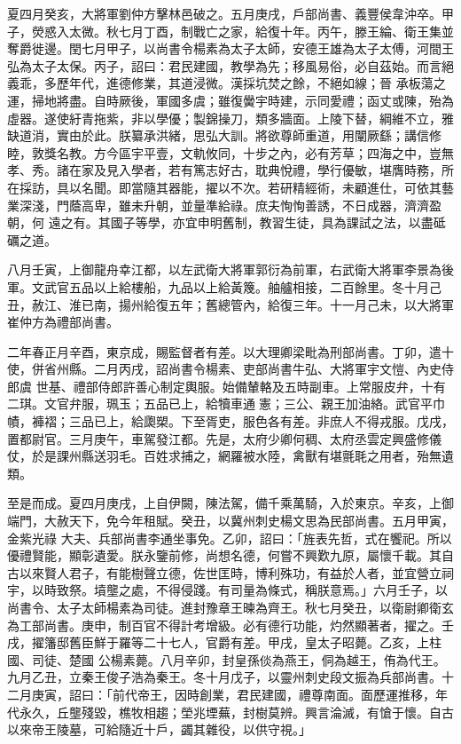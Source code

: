 \begin{pinyinscope}
 夏四月癸亥，大將軍劉仲方擊林邑破之。五月庚戌，戶部尚書、義豐侯韋沖卒。甲子，熒惑入太微。秋七月丁酉，制戰亡之家，給復十年。丙午，滕王綸、衛王集並奪爵徙邊。閏七月甲子，以尚書令楊素為太子太師，安德王雄為太子太傅，河間王弘為太子太保。丙子，詔曰：君民建國，教學為先；移風易俗，必自茲始。而言絕義乖，多歷年代，進德修業，其道浸微。漢採坑焚之餘，不絕如線；晉
 承板蕩之運，掃地將盡。自時厥後，軍國多虞；雖復黌宇時建，示同愛禮；函丈或陳，殆為虛器。遂使紆青拖紫，非以學優；製錦操刀，類多牆面。上陵下替，綱維不立，雅缺道消，實由於此。朕纂承洪緒，思弘大訓。將欲尊師重道，用闡厥繇；講信修睦，敦獎名教。方今區宇平壹，文軌攸同，十步之內，必有芳草；四海之中，豈無孝、秀。諸在家及見入學者，若有篤志好古，耽典悅禮，學行優敏，堪膺時務，所在採訪，具以名聞。即當隨其器能，擢以不次。若研精經術，未顧進仕，可依其藝業深淺，門蔭高卑，雖未升朝，並量準給祿。庶夫恂恂善誘，不日成器，濟濟盈朝，何
 遠之有。其國子等學，亦宜申明舊制，教習生徒，具為課試之法，以盡砥礪之道。



 八月壬寅，上御龍舟幸江都，以左武衛大將軍郭衍為前軍，右武衛大將軍李景為後軍。文武官五品以上給樓船，九品以上給黃篾。舳艫相接，二百餘里。冬十月己丑，赦江、淮已南，揚州給復五年；舊總管內，給復三年。十一月己未，以大將軍崔仲方為禮部尚書。



 二年春正月辛酉，東京成，賜監督者有差。以大理卿梁毗為刑部尚書。丁卯，遣十使，併省州縣。二月丙戌，詔尚書令楊素、吏部尚書牛弘、大將軍宇文愷、內史侍郎虞
 世基、禮部侍郎許善心制定輿服。始備輦輅及五時副車。上常服皮弁，十有二琪。文官弁服，珮玉；五品已上，給犢車通憲；三公、親王加油絡。武官平巾幘，褲褶；三品已上，給瓟槊。下至胥吏，服色各有差。非庶人不得戎服。戊戌，置都尉官。三月庚午，車駕發江都。先是，太府少卿何稠、太府丞雲定興盛修儀仗，於是課州縣送羽毛。百姓求捕之，網羅被水陸，禽獸有堪氈毦之用者，殆無遺類。



 至是而成。夏四月庚戌，上自伊闕，陳法駕，備千乘萬騎，入於東京。辛亥，上御端門，大赦天下，免今年租賦。癸丑，以冀州刺史楊文思為民部尚書。五月甲寅，金紫光祿
 大夫、兵部尚書李通坐事免。乙卯，詔曰：「旌表先哲，式在饗祀。所以優禮賢能，顯彰遺愛。朕永鑒前修，尚想名德，何嘗不興歎九原，屬懷千載。其自古以來賢人君子，有能樹聲立德，佐世匡時，博利殊功，有益於人者，並宜營立祠宇，以時致祭。墳壟之處，不得侵踐。有司量為條式，稱朕意焉。」六月壬子，以尚書令、太子太師楊素為司徒。進封豫章王暕為齊王。秋七月癸丑，以衛尉卿衛玄為工部尚書。庚申，制百官不得計考增級。必有德行功能，灼然顯著者，擢之。壬戌，擢籓邸舊臣鮮于羅等二十七人，官爵有差。甲戌，皇太子昭薨。乙亥，上柱國、司徒、楚國
 公楊素薨。八月辛卯，封皇孫倓為燕王，侗為越王，侑為代王。九月乙丑，立秦王俊子浩為秦王。冬十月戊子，以靈州刺史段文振為兵部尚書。十二月庚寅，詔曰：「前代帝王，因時創業，君民建國，禮尊南面。面歷運推移，年代永久，丘壟殘毀，樵牧相趨；塋兆堙蕪，封樹莫辨。興言淪滅，有愴于懷。自古以來帝王陵墓，可給隨近十戶，蠲其雜役，以供守視。」




\end{pinyinscope}
